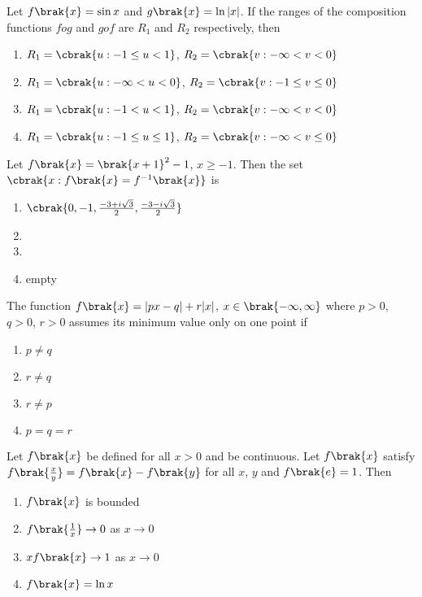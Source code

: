 \item Let $f\brak{x}=\sin{x}$ and $g\brak{x}=\ln{|x|}$. If the ranges of the composition functions $fog$ and $gof$ are $R_1$ and $R_2$ respectively, then 
\hfill{}
\begin{enumerate}
\item $R_1=\cbrak{u:-1\le u<1}$, $R_2=\cbrak{v:-\infty<v<0}$
\item $R_1=\cbrak{u:-\infty<u<0}$, $R_2=\cbrak{v:-1\le v\le0}$
\item $R_1=\cbrak{u:-1<u<1}$, $R_2=\cbrak{v:-\infty<v<0}$
\item $R_1=\cbrak{u:-1\le u\le1}$, $R_2=\cbrak{v:-\infty<v\le0}$
\end{enumerate}

\item Let $f\brak{x}=\brak{x+1}^{2}-1$, $x\ge-1$. Then the set $\cbrak{x:f\brak{x}=f^{-1}\brak{x}}$ is
\hfill{}
\begin{enumerate}
\item $\cbrak{0, -1, \frac{-3+i\sqrt{3}}{2}, \frac{-3-i\sqrt{3}}{2}}$
\item {}
\item {}
\item empty
\end{enumerate}

\item The function $f\brak{x}=|px-q|+r|x|$, $x\in\brak{-\infty,\infty}$ where $p>0$, $q>0$, $r>0$ assumes its minimum value only on one point if
\hfill{}
\begin{multicols}{2}
	\begin{enumerate}
		\item $p\neq q$
		\item $r\neq q$
		\item $r\neq p$ 
		\item $p=q=r$
	\end{enumerate}
\end{multicols}

\item Let $f\brak{x}$ be defined for all $x>0$ and be continuous. Let $f\brak{x}$ satisfy $f\brak{\frac{x}{y}}=f\brak{x}-f\brak{y}$ for all $x$, $y$ and $f\brak{e}=1$. Then
\hfill{}
\begin{multicols}{2}
	\begin{enumerate}
		\item $f\brak{x}$ is bounded 
		\item $f\brak{\frac{1}{x}}\to0$ as $x\to0$
		\item $xf\brak{x}\to1$ as $x\to0$ 
		\item $f\brak{x}=\ln{x}$
	\end{enumerate}
\end{multicols}

